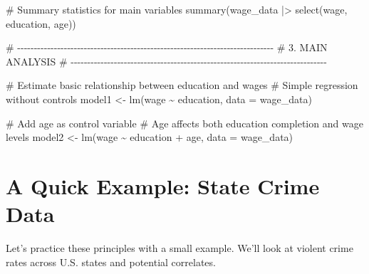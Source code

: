 \documentclass[
  letterpaper,
  DIV=11,
  numbers=noendperiod]{scrreprt}
\newenvironment{Shaded}{\begin{snugshade}}{\end{snugshade}}
\newcommand{\AttributeTok}[1]{\textcolor[rgb]{0.40,0.45,0.13}{#1}}
\newcommand{\CommentTok}[1]{\textcolor[rgb]{0.37,0.37,0.37}{#1}}
\newcommand{\FunctionTok}[1]{\textcolor[rgb]{0.28,0.35,0.67}{#1}}
\newcommand{\NormalTok}[1]{\textcolor[rgb]{0.00,0.23,0.31}{#1}}
\newcommand{\OtherTok}[1]{\textcolor[rgb]{0.00,0.23,0.31}{#1}}
\newcommand{\SpecialCharTok}[1]{\textcolor[rgb]{0.37,0.37,0.37}{#1}}
\begin{document}
\begin{Shaded}
\begin{Highlighting}[]
\CommentTok{\# Summary statistics for main variables}
\FunctionTok{summary}\NormalTok{(wage\_data }\SpecialCharTok{|\textgreater{}} \FunctionTok{select}\NormalTok{(wage, education, age))}

\CommentTok{\# {-}{-}{-}{-}{-}{-}{-}{-}{-}{-}{-}{-}{-}{-}{-}{-}{-}{-}{-}{-}{-}{-}{-}{-}{-}{-}{-}{-}{-}{-}{-}{-}{-}{-}{-}{-}{-}{-}{-}{-}{-}{-}{-}{-}{-}{-}{-}{-}{-}{-}{-}{-}{-}{-}{-}{-}{-}{-}{-}{-}{-}{-}{-}{-}{-}{-}{-}{-}{-}{-}{-}{-}{-}{-}{-}{-}{-}}
\CommentTok{\# 3. MAIN ANALYSIS}
\CommentTok{\# {-}{-}{-}{-}{-}{-}{-}{-}{-}{-}{-}{-}{-}{-}{-}{-}{-}{-}{-}{-}{-}{-}{-}{-}{-}{-}{-}{-}{-}{-}{-}{-}{-}{-}{-}{-}{-}{-}{-}{-}{-}{-}{-}{-}{-}{-}{-}{-}{-}{-}{-}{-}{-}{-}{-}{-}{-}{-}{-}{-}{-}{-}{-}{-}{-}{-}{-}{-}{-}{-}{-}{-}{-}{-}{-}{-}{-}}

\CommentTok{\# Estimate basic relationship between education and wages}
\CommentTok{\# Simple regression without controls}
\NormalTok{model1 }\OtherTok{\textless{}{-}} \FunctionTok{lm}\NormalTok{(wage }\SpecialCharTok{\textasciitilde{}}\NormalTok{ education, }\AttributeTok{data =}\NormalTok{ wage\_data)}

\CommentTok{\# Add age as control variable}
\CommentTok{\# Age affects both education completion and wage levels}
\NormalTok{model2 }\OtherTok{\textless{}{-}} \FunctionTok{lm}\NormalTok{(wage }\SpecialCharTok{\textasciitilde{}}\NormalTok{ education }\SpecialCharTok{+}\NormalTok{ age, }\AttributeTok{data =}\NormalTok{ wage\_data)}
\end{Highlighting}
\end{Shaded}

\section{A Quick Example: State Crime
Data}\label{a-quick-example-state-crime-data}

Let's practice these principles with a small example. We'll look at
violent crime rates across U.S. states and potential correlates.
\end{document}
